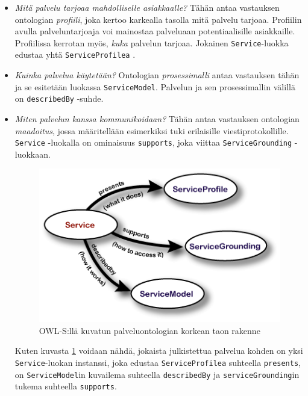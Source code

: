 \documentclass[finnish]{tktltiki2}
\theoremstyle{definition}
\theoremstyle{remark}
\begin{document}
\begin{itemize}

  \item \textit{Mitä palvelu tarjoaa mahdolliselle asiakkaalle?} Tähän antaa vastauksen ontologian \textit{profiili}, joka kertoo karkealla tasolla mitä palvelu tarjoaa. Profiilin 
 avulla palveluntarjoaja voi mainostaa palveluaan potentiaalisille asiakkaille. Profiilissa kerrotan myös, \textit{kuka} palvelun tarjoaa. Jokainen \texttt{Service}-luokka edustaa yhtä \texttt{ServiceProfilea} \cite{OWLS}.
 
 \item \textit{Kuinka palvelua käytetään?} Ontologian \textit{prosessimalli} antaa vastauksen tähän ja se esitetään luokassa \texttt{ServiceModel}. Palvelun ja sen prosessimallin 
 välillä on \texttt{describedBy} -suhde\cite{OWLS}. 
 
 \item \textit{Miten palvelun kanssa kommunikoidaan?} Tähän antaa vastauksen ontologian \textit{maadoitus}, jossa määritellään esimerkiksi tuki erilaisille viestiprotokollille. 
 \texttt{Service} -luokalla on ominaisuus \texttt{supports}, joka viittaa \texttt{ServiceGrounding} -luokkaan\cite{OWLS}.  
 
 \begin{figure}[ht]
 \centering
 \includegraphics[scale=0.60]{karkea_taso.png}
 \caption{OWL-S:llä kuvatun palveluontologian korkean taon rakenne \cite{OWLS}}
 \label{karkea_taso}
\end{figure}
 
 Kuten kuvasta \ref{karkea_taso}  voidaan nähdä, jokaista julkistettua palvelua kohden on yksi \texttt{Service}-luokan instanssi, joka edustaa \texttt{ServiceProfilea} suhteella \texttt{presents}, on \texttt{ServiceModel}in kuvailema suhteella \texttt{describedBy} ja \texttt{serviceGrounding}in tukema suhteella \texttt{supports}.
 
\end{itemize}
\end{document}
